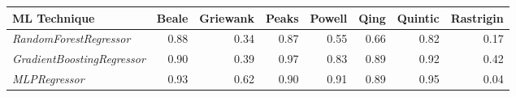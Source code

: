 \begin{table}[ht]
\centering
\begin{tabular}{lrrrrrrr}
  \hline
ML Technique & Beale & Griewank & Peaks & Powell & Qing & Quintic & Rastrigin \\ 
  \hline
{\em RandomForestRegressor} & 0.88 & 0.34 & 0.87 & 0.55 & 0.66 & 0.82 & 0.17 \\ 
  {\em GradientBoostingRegressor} & 0.90 & 0.39 & 0.97 & 0.83 & 0.89 & 0.92 & 0.42 \\ 
  {\em MLPRegressor} & 0.93 & 0.62 & 0.90 & 0.91 & 0.89 & 0.95 & 0.04 \\ 
   \hline
\end{tabular}
\end{table}
